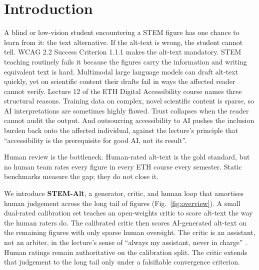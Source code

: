 \documentclass[pdflatex,sn-mathphys-num]{sn-jnl}
\begin{document}

\maketitle

\section{Introduction}\label{sec:intro}

A blind or low-vision student encountering a STEM figure has one chance to learn from it: the text alternative. If the alt-text is wrong, the student cannot tell. WCAG 2.2 Success Criterion 1.1.1 \cite{wcag22nontext} makes the alt-text mandatory. STEM teaching routinely fails it because the figures carry the information and writing equivalent text is hard. Multimodal large language models can draft alt-text quickly, yet on scientific content their drafts fail in ways the affected reader cannot verify. Lecture 12 of the ETH Digital Accessibility course \cite{bolfingHeim2026Lecture12} names three structural reasons. Training data on complex, novel scientific content is sparse, so AI interpretations are sometimes highly flawed. Trust collapses when the reader cannot audit the output. And outsourcing accessibility to AI pushes the inclusion burden back onto the affected individual, against the lecture's principle that ``accessibility is the prerequisite for good AI, not its result''.

Human review is the bottleneck. Human-rated alt-text is the gold standard, but no human team rates every figure in every ETH course every semester. Static benchmarks measure the gap; they do not close it.

We introduce \textbf{STEM-Alt}, a generator, critic, and human loop that amortises human judgement across the long tail of figures (Fig.~\ref{fig:overview}). A small dual-rated calibration set teaches an open-weights critic to score alt-text the way the human raters do. The calibrated critic then scores AI-generated alt-text on the remaining figures with only sparse human oversight. The critic is an assistant, not an arbiter, in the lecture's sense of ``always my assistant, never in charge'' \cite{bolfingHeim2026Lecture12}. Human ratings remain authoritative on the calibration split. The critic extends that judgement to the long tail only under a falsifiable convergence criterion.
\end{document}
